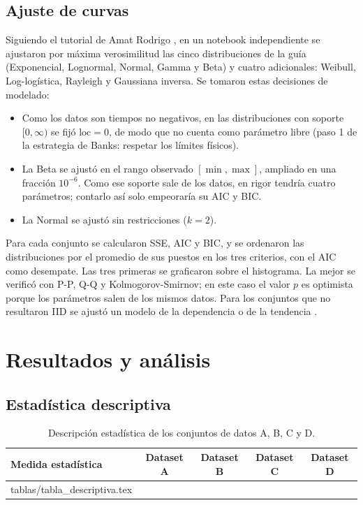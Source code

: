 \documentclass[11pt,a4paper]{article}
\makeatletter
\newcommand{\inputtablerows}[1]{\@@input #1 }
\makeatother
\begin{document}
\subsection{Ajuste de curvas}
Siguiendo el tutorial de Amat Rodrigo \cite{amat2021}, en un notebook independiente se ajustaron
por máxima verosimilitud las cinco distribuciones de la guía (Exponencial, Lognormal, Normal,
Gamma y Beta) y cuatro adicionales: Weibull, Log-logística, Rayleigh y Gaussiana inversa. Se
tomaron estas decisiones de modelado:
\begin{itemize}
 \item Como los datos son tiempos no negativos, en las distribuciones con soporte $[0,\infty)$ se
 fijó $\text{loc}=0$, de modo que no cuenta como parámetro libre (paso 1 de la estrategia de
 Banks: respetar los límites físicos).
 \item La Beta se ajustó en el rango observado $[\min,\max]$, ampliado en una fracción $10^{-6}$.
 Como ese soporte sale de los datos, en rigor tendría cuatro parámetros; contarlo así solo
 empeoraría su AIC y BIC.
 \item La Normal se ajustó sin restricciones ($k=2$).
\end{itemize}
Para cada conjunto se calcularon SSE, AIC y BIC, y se ordenaron las distribuciones por el
promedio de sus puestos en los tres criterios, con el AIC como desempate. Las tres primeras se
graficaron sobre el histograma. La mejor se verificó con P-P, Q-Q y Kolmogorov-Smirnov; en este
caso el valor $p$ es optimista porque los parámetros salen de los mismos datos. Para los
conjuntos que no resultaron IID se ajustó un modelo de la dependencia o de la tendencia
\cite[Sec.~3.6]{banks1998}.

\section{Resultados y análisis}
\subsection{Estadística descriptiva}
\begin{table}[H]\centering\small
\caption{Descripción estadística de los conjuntos de datos A, B, C y D.}\label{tab:desc}
\begin{tabular}{lcccc}\toprule
\textbf{Medida estadística}&\textbf{Dataset A}&\textbf{Dataset B}&\textbf{Dataset C}&\textbf{Dataset D}\\\midrule
\inputtablerows{tablas/tabla_descriptiva.tex}
\bottomrule
\end{tabular}\end{table}
\end{document}
